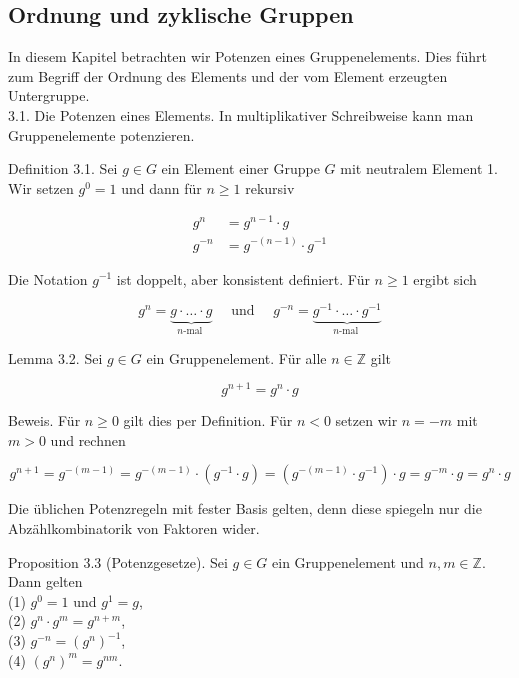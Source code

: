\documentclass[10pt, letterpaper]{article}
\begin{document}
\pagebreak



\subsection{Ordnung und zyklische Gruppen}



In diesem Kapitel betrachten wir Potenzen eines Gruppenelements. Dies führt zum Begriff der Ordnung des Elements und der vom Element erzeugten Untergruppe.\\
3.1. Die Potenzen eines Elements. In multiplikativer Schreibweise kann man Gruppenelemente potenzieren.

Definition 3.1. Sei $g \in G$ ein Element einer Gruppe $G$ mit neutralem Element 1. Wir setzen $g^{0}=1$ und dann für $n \geq 1$ rekursiv

$$
\begin{aligned}
g^{n} & =g^{n-1} \cdot g \\
g^{-n} & =g^{-(n-1)} \cdot g^{-1}
\end{aligned}
$$

Die Notation $g^{-1}$ ist doppelt, aber konsistent definiert. Für $n \geq 1$ ergibt sich

$$
g^{n}=\underbrace{g \cdot \ldots \cdot g}_{n \text {-mal }} \quad \text { und } \quad g^{-n}=\underbrace{g^{-1} \cdot \ldots \cdot g^{-1}}_{n \text {-mal }}
$$

Lemma 3.2. Sei $g \in G$ ein Gruppenelement. Für alle $n \in \mathbb{Z}$ gilt

$$
g^{n+1}=g^{n} \cdot g
$$

Beweis. Für $n \geq 0$ gilt dies per Definition. Für $n<0$ setzen wir $n=-m$ mit $m>0$ und rechnen

$$
g^{n+1}=g^{-(m-1)}=g^{-(m-1)} \cdot\left(g^{-1} \cdot g\right)=\left(g^{-(m-1)} \cdot g^{-1}\right) \cdot g=g^{-m} \cdot g=g^{n} \cdot g
$$

Die üblichen Potenzregeln mit fester Basis gelten, denn diese spiegeln nur die Abzählkombinatorik von Faktoren wider.

Proposition 3.3 (Potenzgesetze). Sei $g \in G$ ein Gruppenelement und $n, m \in \mathbb{Z}$. Dann gelten\\
(1) $g^{0}=1$ und $g^{1}=g$,\\
(2) $g^{n} \cdot g^{m}=g^{n+m}$,\\
(3) $g^{-n}=\left(g^{n}\right)^{-1}$,\\
(4) $\left(g^{n}\right)^{m}=g^{n m}$.
\end{document}
